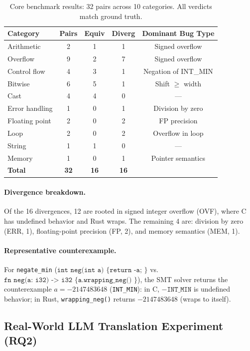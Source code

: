 \documentclass[11pt,a4paper]{article}
\begin{document}
\begin{table}[t]
\centering
\small
\caption{Core benchmark results: 32 pairs across 10 categories.
All verdicts match ground truth.}
\label{tab:core-results}
\begin{tabular}{@{}lcccc@{}}
\toprule
Category & Pairs & Equiv & Diverg & Dominant Bug Type \\
\midrule
Arithmetic       & 2 & 1 & 1 & Signed overflow \\
Overflow         & 9 & 2 & 7 & Signed overflow \\
Control flow     & 4 & 3 & 1 & Negation of INT\_MIN \\
Bitwise          & 6 & 5 & 1 & Shift $\geq$ width \\
Cast             & 4 & 4 & 0 & --- \\
Error handling   & 1 & 0 & 1 & Division by zero \\
Floating point   & 2 & 0 & 2 & FP precision \\
Loop             & 2 & 0 & 2 & Overflow in loop \\
String           & 1 & 1 & 0 & --- \\
Memory           & 1 & 0 & 1 & Pointer semantics \\
\midrule
\textbf{Total}   & \textbf{32} & \textbf{16} & \textbf{16} & \\
\bottomrule
\end{tabular}
\end{table}

\paragraph{Divergence breakdown.}
Of the 16 divergences, 12 are rooted in signed integer overflow (OVF),
where C has undefined behavior and Rust wraps.  The remaining 4 are:
division by zero (ERR, 1), floating-point precision (FP, 2), and
memory semantics (MEM, 1).

\paragraph{Representative counterexample.}
For \texttt{negate\_min} ($\texttt{int neg(int a) \{ return -a; \}}$
vs.\ $\texttt{fn neg(a: i32) -> i32 \{ a.wrapping\_neg() \}}$),
the SMT solver returns the counterexample $a = -2147483648$
(\texttt{INT\_MIN}): in C, $-\texttt{INT\_MIN}$ is undefined behavior;
in Rust, \texttt{wrapping\_neg()} returns $-2147483648$ (wraps to itself).

\subsection{Real-World LLM Translation Experiment (RQ2)}\label{sec:eval-realworld}
\end{document}
